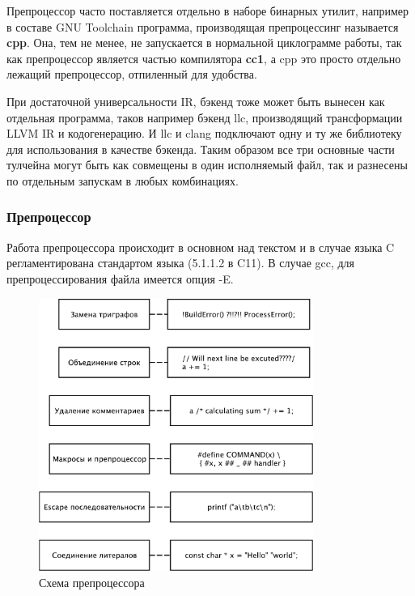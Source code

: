 \documentclass[a4paper,12pt,oneside]{article}
\begin{document}
Препроцессор часто поставляется отдельно в наборе бинарных утилит, например в составе GNU Toolchain программа, производящая препроцессинг называется \textbf{cpp}. Она, тем не менее, не запускается в нормальной циклограмме работы, так как препроцессор является частью компилятора \textbf{cc1}, а cpp это просто отдельно лежащий препроцессор, отпиленный для удобства.

При достаточной универсальности IR, бэкенд тоже может быть вынесен как отдельная программа, таков например бэкенд llc, производящий трансформации LLVM IR и кодогенерацию. И llc и clang подключают одну и ту же библиотеку для использования в качестве бэкенда. Таким образом все три основные части тулчейна могут быть как совмещены в один исполняемый файл, так и разнесены по отдельным запускам в любых комбинациях.

\subsubsection{Препроцессор}\label{subsec:Preprocessor}

Работа препроцессора происходит в основном над текстом и в случае языка C регламентирована стандартом языка (5.1.1.2 в C11). В случае gcc, для препроцессирования файла имеется опция -E.

\begin{figure}[ht]
\centering
\includegraphics[width=0.8\textwidth]{illustrations/preprocessor-scheme-crop.pdf}
\caption{Схема препроцессора}
\label{fig:preproc_scheme}
\end{figure}
\end{document}
